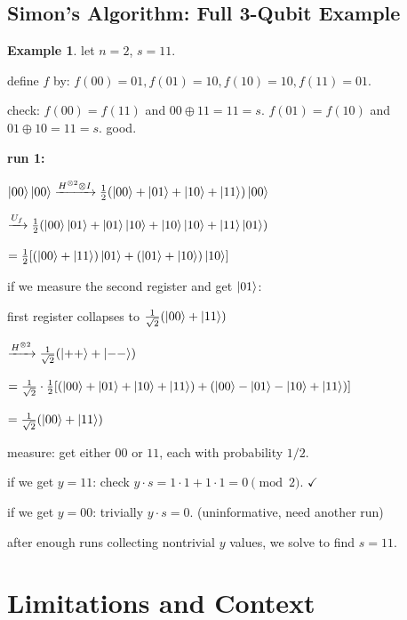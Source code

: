 \documentclass[11pt,a4paper]{article}
\theoremstyle{definition}
\newtheorem{example}{Example}[section]
\theoremstyle{remark}
\begin{document}
\subsection{Simon's Algorithm: Full 3-Qubit Example}

\begin{example}
let $n = 2$, $s = 11$.

define $f$ by: $f(00) = 01, f(01) = 10, f(10) = 10, f(11) = 01$.

check: $f(00) = f(11)$ and $00 \oplus 11 = 11 = s$. $f(01) = f(10)$ and $01 \oplus 10 = 11 = s$. good.

\textbf{run 1:}

$\ket{00}\ket{00} \xrightarrow{H^{\otimes 2} \otimes I} \frac{1}{2}(\ket{00} + \ket{01} + \ket{10} + \ket{11})\ket{00}$

$\xrightarrow{U_f} \frac{1}{2}(\ket{00}\ket{01} + \ket{01}\ket{10} + \ket{10}\ket{10} + \ket{11}\ket{01})$

$= \frac{1}{2}[(\ket{00} + \ket{11})\ket{01} + (\ket{01} + \ket{10})\ket{10}]$

if we measure the second register and get $\ket{01}$:

first register collapses to $\frac{1}{\sqrt{2}}(\ket{00} + \ket{11})$

$\xrightarrow{H^{\otimes 2}} \frac{1}{\sqrt{2}}(\ket{++} + \ket{--})$

$= \frac{1}{\sqrt{2}} \cdot \frac{1}{2}[(\ket{00} + \ket{01} + \ket{10} + \ket{11}) + (\ket{00} - \ket{01} - \ket{10} + \ket{11})]$

$= \frac{1}{\sqrt{2}}(\ket{00} + \ket{11})$

measure: get either $00$ or $11$, each with probability $1/2$.

if we get $y = 11$: check $y \cdot s = 1 \cdot 1 + 1 \cdot 1 = 0 \pmod{2}$. $\checkmark$

if we get $y = 00$: trivially $y \cdot s = 0$. (uninformative, need another run)

after enough runs collecting nontrivial $y$ values, we solve to find $s = 11$.
\end{example}

\section{Limitations and Context}
\end{document}
